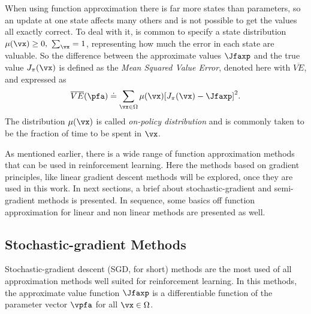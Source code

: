 When using function approximation there is far more states than parameters, so an update at one state affects many others and is not possible to get the values all exactly correct.
To deal with it, is common to specify a state distribution $\mu(\vx) \ge 0,\ \sum_\vx = 1$, representing how much the error in each state are valuable.
So the difference between the approximate values $\Jfaxp$ and the true value  $J_\pi(\vx)$ is defined as the \textit{Mean Squared Value Error}, denoted here with $\overline{VE}$, and expressed as
\begin{equation}
  \overline{VE}(\pfa) \doteq \sum_{\vx \in \Omega} \mu(\vx) {\left[ J_\pi(\vx) - \Jfaxp \right]}^2
  \label{eq:VE}.
\end{equation}
The distribution $\mu(\vx)$ is called  \textit{on-policy distribution} and is commonly taken to be the fraction of time to be spent in $\vx$.

As mentioned earlier, there is a wide range of function approximation methods that can be used in reinforcement learning.
Here the methods based on gradient principles, like linear gradient descent methods will be explored, once they are used in this work.
In next sections, a brief about stochastic-gradient and semi-gradient methods is presented.
In sequence, some basics off function approximation for linear and non linear methods are presented as well. 

\subsection{Stochastic-gradient Methods}%
  \label{sub:stochastic_gradient_methods}

Stochastic-gradient descent (SGD, for short) methods are the most used of all approximation methods well suited for reinforcement learning.
In this methods, the approximate value function $\Jfaxp$ is a differentiable function of the parameter vector  $\vpfa$ for all  $\vx \in \Omega$. 

